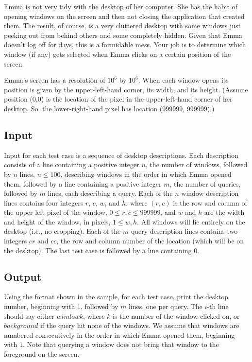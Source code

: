 Emma is not very tidy with the desktop of her computer. She has the habit of
opening windows on the screen and then not closing the application that created
them. The result, of course, is a very cluttered desktop with some windows just
peeking out from behind others and some completely hidden. Given that Emma
doesn't log off for days, this is a formidable mess. Your job is to determine
which window (if any) gets selected when Emma clicks on a certain position of
the screen.

Emma's screen has a resolution of $10^6$ by $10^6$. When each window opens its
position is given by the upper-left-hand corner, its width, and its height.
(Assume position (0,0) is the location of the pixel in the upper-left-hand
 corner of her desktop. So, the lower-right-hand pixel has location (999999,
 999999).)

\subsection*{Input}

Input for each test case is a sequence of desktop descriptions. Each description
consists of a line containing a positive integer $n$, the number of windows,
followed by $n$ lines, $n \leq 100$, describing windows in the order in which
Emma opened them, followed by a line containing a positive integer $m$,
the number of queries, followed by $m$ lines, each describing a query.
Each of the $n$ window description lines contains four integers $r$, $c$, $w$,
and $h$, where $(r, c)$ is the row and column of the upper left pixel of
the window, $0 \leq r, c \leq 999999$, and $w$ and $h$ are the width and
height of the window, in pixels, $1 \leq w, h$. All windows will lie
entirely on the desktop (i.e., no cropping). Each of the $m$ query
description lines contains two integers $cr$ and $cc$, the row and column
number of the location (which will be on the desktop). The last test
case is followed by a line containing $0$.

\subsection*{Output}

Using the format shown in the sample, for each test case, print the desktop
number, beginning with 1, followed by $m$ lines, one per query. The $i$-th line
should say either $window k$, where $k$ is the number of the window clicked on,
or $background$ if the query hit none of the windows. We assume that
windows are numbered consecutively in the order in which Emma opened
them, beginning with $1$. Note that querying a window does not bring that
window to the foreground on the screen.

